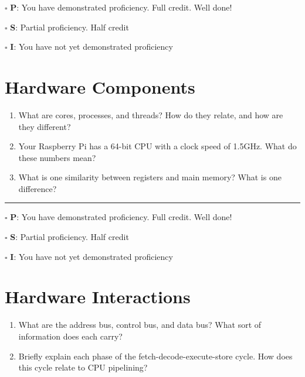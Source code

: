 \documentclass[12pt]{article}
\begin{document}
$\square$ \textbf{P}: You have demonstrated proficiency. Full credit. Well done!

$\square$ \textbf{S}: Partial proficiency. Half credit

$\square$ \textbf{I}: You have not yet demonstrated proficiency

\newpage



\section*{Hardware Components}

\begin{enumerate}
\item What are cores, processes, and threads? How do they relate, and how are they different?
\vfill

\item Your Raspberry Pi has a 64-bit CPU with a clock speed of 1.5GHz. What do these numbers mean?
\vfill

\item What is one similarity between registers and main memory? What is one difference?
\vfill
\end{enumerate}

\vfill

\rule[1ex]{\textwidth}{.1pt}

$\square$ \textbf{P}: You have demonstrated proficiency. Full credit. Well done!

$\square$ \textbf{S}: Partial proficiency. Half credit

$\square$ \textbf{I}: You have not yet demonstrated proficiency

\newpage



\section*{Hardware Interactions}


\begin{enumerate}
\item What are the address bus, control bus, and data bus? What sort of information does each carry?
\vfill

\item Briefly explain each phase of the fetch-decode-execute-store cycle. How does this cycle relate to CPU pipelining?
\vfill

\end{enumerate}
\end{document}

